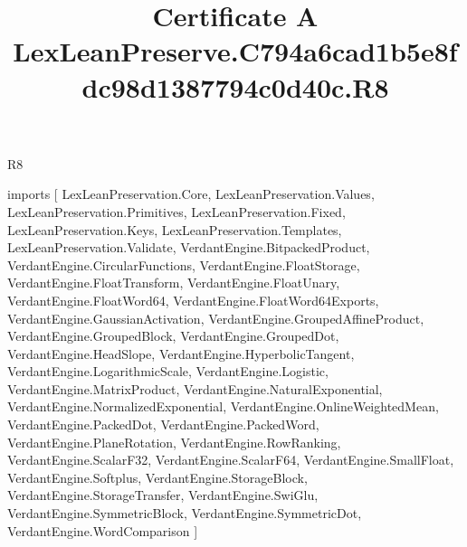\begin{lexlean}{R8}
\title{Certificate A LexLeanPreserve.C794a6cad1b5e8fdc98d1387794c0d40c.R8}
\begin{coremodule}
imports [
  LexLeanPreservation.Core,
  LexLeanPreservation.Values,
  LexLeanPreservation.Primitives,
  LexLeanPreservation.Fixed,
  LexLeanPreservation.Keys,
  LexLeanPreservation.Templates,
  LexLeanPreservation.Validate,
  VerdantEngine.BitpackedProduct,
  VerdantEngine.CircularFunctions,
  VerdantEngine.FloatStorage,
  VerdantEngine.FloatTransform,
  VerdantEngine.FloatUnary,
  VerdantEngine.FloatWord64,
  VerdantEngine.FloatWord64Exports,
  VerdantEngine.GaussianActivation,
  VerdantEngine.GroupedAffineProduct,
  VerdantEngine.GroupedBlock,
  VerdantEngine.GroupedDot,
  VerdantEngine.HeadSlope,
  VerdantEngine.HyperbolicTangent,
  VerdantEngine.LogarithmicScale,
  VerdantEngine.Logistic,
  VerdantEngine.MatrixProduct,
  VerdantEngine.NaturalExponential,
  VerdantEngine.NormalizedExponential,
  VerdantEngine.OnlineWeightedMean,
  VerdantEngine.PackedDot,
  VerdantEngine.PackedWord,
  VerdantEngine.PlaneRotation,
  VerdantEngine.RowRanking,
  VerdantEngine.ScalarF32,
  VerdantEngine.ScalarF64,
  VerdantEngine.SmallFloat,
  VerdantEngine.Softplus,
  VerdantEngine.StorageBlock,
  VerdantEngine.StorageTransfer,
  VerdantEngine.SwiGlu,
  VerdantEngine.SymmetricBlock,
  VerdantEngine.SymmetricDot,
  VerdantEngine.WordComparison
]


\end{coremodule}
\end{lexlean}
